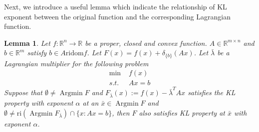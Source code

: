 \documentclass{article}
\numberwithin{equation}{section}
\newtheorem{lemma}{Lemma}[section]
\def\Argmin{\mathop{\mathrm{Argmin}}}
\begin{document}
Next, we introduce a useful lemma which indicate the relationship of KL exponent between the original function 
and the corresponding Lagrangian function. 
\begin{lemma} \label{lemma_of_Lagrangian_KL_exponent}
    Let $f: \mathbb{R}^n \rightarrow \mathbb{R}$ be a proper, closed and convex function. $A\in \mathbb{R}^{m\times n}$ 
    and $b\in \mathbb{R}^m$ satisfy $b \in A \mathrm{ri} \mathrm{dom} f$. Let $F(x) = f(x) + \delta_{\{b\}}(Ax)$.  
    Let $\bar{\lambda}$ be a Lagrangian multiplier for the following problem
    \begin{align}
        \min\hspace{4pt} &f(x) \nonumber \\
        s.t. \hspace{4pt} & Ax = b \nonumber 
    \end{align}  
    Suppose that $\emptyset \neq \Argmin F$ and $F_{\bar{\lambda}}(x) := f(x) -\bar{\lambda}^TAx$ satisfies the KL property with exponent $\alpha$ 
    at an $\bar{x}\in \Argmin F$ and $\emptyset \neq \mathrm{ri} (\Argmin F_{\bar{\lambda}}) \cap \{x: Ax = b\}$, then 
    $F$ also satisfies KL property at $\bar{x}$ with exponent $\alpha$. 
\end{lemma}
\end{document}
